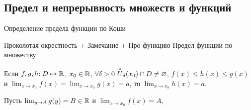 \subsection{Предел и непрерывность множеств и функций}


Определение предела функции по Коши

Проколотая окрестность
+ Замечание
+ Про функцию
Предел функции по множеству




\begin{theorem}
	Если $f, g, h{:}\; D \mapsto \mathbb{R}$, $x_0 \in \mathbb{R}$, $\forall \delta > 0\ \overset{\circ}{U}_\delta(x_0) \cap D \ne \varnothing$, $f(x) \le h(x) \le g(x)$ и $\lim_{x \to x_0} f(x) = \lim_{x \to x_0} g(x) = a$, то $\lim_{x \to x_0} h(x) = a$.
\end{theorem}

Пусть $\lim_{y \to A} g(y) = B \in \mathbb{R}$ и $\lim_{x \to x_0} f(x) = A$, 


